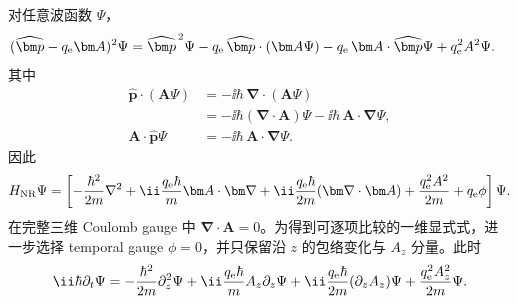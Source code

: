 对任意波函数 $\Psi$，
\begin{align}
(\widehat{\bm p}-q_{\rm e}\bm A)^2\Psi
={}&\widehat{\bm p}^{\,2}\Psi
-q_{\rm e}\,\widehat{\bm p}\cdot(\bm A\Psi)
-q_{\rm e}\,\bm A\cdot\widehat{\bm p}\Psi
+q_{\rm e}^2A^2\Psi.
\end{align}
其中
\begin{align}
\widehat{\bm p}\cdot(\bm A\Psi)
&=-\ii\hbar\,\bm\nabla\cdot(\bm A\Psi)\\
&=-\ii\hbar(\bm\nabla\cdot\bm A)\Psi
-\ii\hbar\,\bm A\cdot\bm\nabla\Psi,
\\
\bm A\cdot\widehat{\bm p}\Psi
&=-\ii\hbar\,\bm A\cdot\bm\nabla\Psi.
\end{align}
因此
\begin{equation}
H_{\rm NR}\Psi
=
\left[
-\frac{\hbar^2}{2m}\nabla^2
+\ii\frac{q_{\rm e}\hbar}{m}\bm A\cdot\bm\nabla
+\ii\frac{q_{\rm e}\hbar}{2m}(\bm\nabla\cdot\bm A)
+\frac{q_{\rm e}^2A^2}{2m}+q_{\rm e}\phi
\right]\Psi.
\label{eq:nr-h-expanded}
\end{equation}
在完整三维 Coulomb gauge 中 $\bm\nabla\cdot\bm A=0$。为得到可逐项比较的一维显式式，进一步选择 temporal gauge $\phi=0$，并只保留沿 $z$ 的包络变化与 $A_z$ 分量。此时
\begin{equation}
\ii\hbar\partial_t\Psi
=
-\frac{\hbar^2}{2m}\partial_z^2\Psi
+\ii\frac{q_{\rm e}\hbar}{m}A_z\partial_z\Psi
+\ii\frac{q_{\rm e}\hbar}{2m}(\partial_zA_z)\Psi
+\frac{q_{\rm e}^2A_z^2}{2m}\Psi.
\label{eq:nr-sch-1d}
\end{equation}

